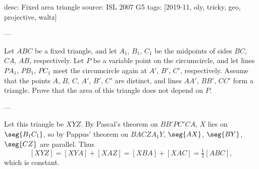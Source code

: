 desc: Fixed area triangle
source: ISL 2007 G5
tags: [2019-11, oly, tricky, geo, projective, waltz]

---

Let $ABC$ be a fixed triangle, and let $A_1$, $B_1$, $C_1$ be the midpoints of sides $BC$, $CA$, $AB$, respectively. Let $P$ be a variable point on the circumcircle, and let lines $PA_1$, $PB_1$, $PC_1$ meet the circumcircle again at $A'$, $B'$, $C'$, respectively. Assume that the points $A$, $B$, $C$, $A'$, $B'$, $C'$ are distinct, and lines $AA'$, $BB'$, $CC'$ form a triangle. Prove that the area of this triangle does not depend on $P$.

---

Let this triangle be $XYZ$. By Pascal's theorem on $BB'PC'CA$, $X$ lies on $\seg{B_1C_1}$, so by Pappus' theorem on $BACZA_1Y$, $\seg{AX}$, $\seg{BY}$, $\seg{CZ}$ are parallel. Thus \[ [XYZ]=[XYA]+[XAZ]=[XBA]+[XAC]=\tfrac12[ABC],\]
which is constant.
